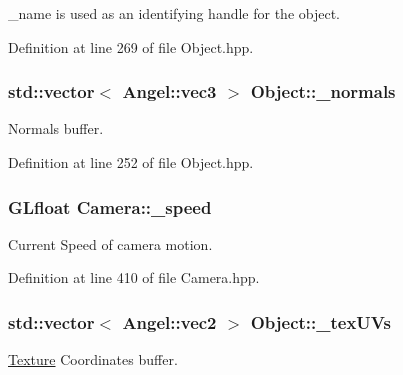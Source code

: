 \-\_\-name is used as an identifying handle for the object. 



Definition at line 269 of file Object.\-hpp.

\hypertarget{class_object_a20bb786cb5915934853855aab9d1a1b3}{
\subsubsection[{\-\_\-normals}]{\setlength{\rightskip}{0pt plus 5cm}std\-::vector$<$ {\bf Angel\-::vec3} $>$ Object\-::\-\_\-normals\hspace{0.3cm}{\ttfamily [inherited]}}}\label{class_object_a20bb786cb5915934853855aab9d1a1b3}


Normals buffer. 



Definition at line 252 of file Object.\-hpp.

\hypertarget{class_camera_a21f8eb53e5369018e39add0453ae626d}{
\subsubsection[{\-\_\-speed}]{\setlength{\rightskip}{0pt plus 5cm}G\-Lfloat Camera\-::\-\_\-speed\hspace{0.3cm}{\ttfamily [private]}}}\label{class_camera_a21f8eb53e5369018e39add0453ae626d}


Current Speed of camera motion. 



Definition at line 410 of file Camera.\-hpp.

\hypertarget{class_object_aa9ddc3b95d74b76ab8a251fb376dfafb}{
\subsubsection[{\-\_\-tex\-U\-Vs}]{\setlength{\rightskip}{0pt plus 5cm}std\-::vector$<$ {\bf Angel\-::vec2} $>$ Object\-::\-\_\-tex\-U\-Vs\hspace{0.3cm}{\ttfamily [inherited]}}}\label{class_object_aa9ddc3b95d74b76ab8a251fb376dfafb}


\hyperlink{class_texture}{Texture} Coordinates buffer. 



